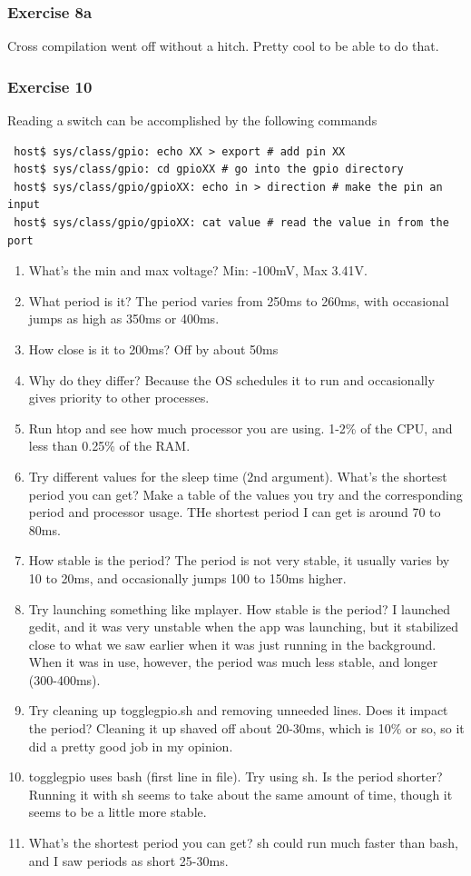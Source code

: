 \documentclass[letterpaper,10pt]{texMemo}
\begin{document}
\subsubsection{Exercise 8a}
\noindent Cross compilation went off without a hitch. Pretty cool to be able to
do that.

\subsubsection{Exercise 10}

\noindent Reading a switch can be accomplished by the following commands
\begin{verbatim}
 host$ sys/class/gpio: echo XX > export # add pin XX
 host$ sys/class/gpio: cd gpioXX # go into the gpio directory
 host$ sys/class/gpio/gpioXX: echo in > direction # make the pin an input
 host$ sys/class/gpio/gpioXX: cat value # read the value in from the port
\end{verbatim}

\begin{enumerate}
 \item What's the min and max voltage? Min: -100mV, Max 3.41V.
 \item What period is it? The period varies from 250ms to 260ms, with
occasional jumps as high as 350ms or 400ms.
 \item How close is it to 200ms? Off by about 50ms
 \item Why do they differ? Because the OS schedules it to run and occasionally
gives priority to other processes.
 \item Run htop and see how much processor you are using. 1-2\% of the CPU, and
less than 0.25\% of the RAM.
 \item Try different values for the sleep time (2nd argument). What's the
shortest
period you can get? Make a table of the values you try and the corresponding
period and processor usage. THe shortest period I can get is around 70 to 80ms.
 \item How stable is the period? The period is not very stable, it usually
varies by 10 to 20ms, and occasionally jumps 100 to 150ms higher.
 \item Try launching something like mplayer. How stable is the period? I
launched gedit, and it was very unstable when the app was launching, but it
stabilized close to what we saw earlier when it was just running in the
background. When it was in use, however, the period was much less stable, and
longer (300-400ms).
 \item Try cleaning up togglegpio.sh and removing unneeded lines. Does it impact
the period? Cleaning it up shaved off about 20-30ms, which is 10\% or so, so it
did a pretty good job in my opinion.
 \item togglegpio uses bash (first line in file). Try using sh. Is the period
shorter? Running it with sh seems to take about the same amount of time, though
it seems to be a little more stable.
 \item What's the shortest period you can get? sh could run much faster than
bash, and I saw periods as short 25-30ms.
\end{enumerate}
\end{document}
